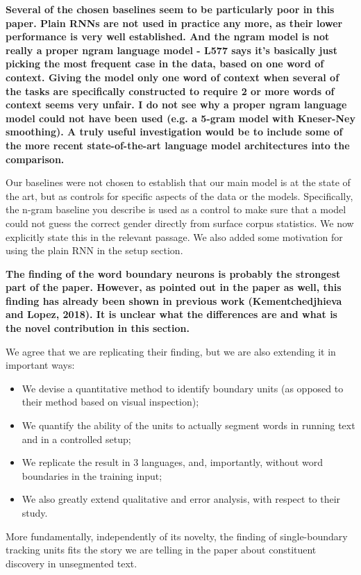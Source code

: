 \documentclass{article}[11pt,a4paper,oneside]
\begin{document}
\textbf{
Several of the chosen baselines seem to be particularly poor in this paper.
Plain RNNs are not used in practice any more, as their lower performance is
very well established. And the ngram model is not really a proper ngram
language model - L577 says it's basically just picking the most frequent
case in the data, based on one word of context. Giving the model only one
word of context when several of the tasks are specifically constructed to
require 2 or more words of context seems very unfair. I do not see why a
proper ngram language model could not have been used (e.g. a 5-gram model
with Kneser-Ney smoothing). A truly useful investigation would be to include
some of the more recent state-of-the-art language model architectures into
the comparison.}

Our baselines were not chosen to establish that our main model is at the state of the art, but as controls for specific aspects of the data or the models. Specifically, the n-gram baseline you describe is used as a control to make sure that a model could not guess the correct gender directly from surface corpus statistics. We now explicitly state this in the relevant passage. We also added some motivation for using the plain RNN in the setup section.\newline

\textbf{
The finding of the word boundary neurons is probably the strongest part of
the paper.
However, as pointed out in the paper as well, this finding has already been
shown in previous work (Kementchedjhieva and Lopez, 2018).
It is unclear what the differences are and what is the novel contribution in
this section.}

We agree that we are replicating their finding, but we are also extending it in important ways:
\begin{itemize}
\item We devise a quantitative method to identify boundary units (as opposed to their method based on visual inspection);
\item We quantify the ability of the units to actually segment words in running text and in a controlled setup;
\item We replicate the result in 3 languages, and, importantly, without word boundaries in the training input;
\item We also greatly extend qualitative and error analysis, with respect to their study.
\end{itemize}
More fundamentally, independently of its novelty, the finding of single-boundary tracking units fits the story we are telling in the paper about constituent discovery in unsegmented text.
\end{document}
